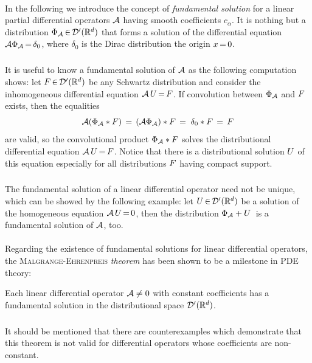\documentclass[11pt,twoside]{article}
\begin{document}
\paragraph{} %
In the following we introduce the concept of \textit{fundamental solution}
for a linear partial differential operators ${\mathcal{A}}$
having smooth coefficients $c_{\alpha}$.
It is nothing but a distribution $\Phi_{{\mathcal{A}}} {\,\in\,} {\mathcal{D}}'({\mathbb{R}}^d)$
that forms a solution of the differential equation
${\mathcal{A}} \Phi_{{\mathcal{A}}} {\,=\,} \delta_0$,
where $\delta_0$ is the Dirac distribution {\wrt} the origin $x {\,=\,} 0$.

\subparagraph{}
It is useful to know a fundamental solution of ${\mathcal{A}}$
as the following computation shows:
let $F {\,\in\,} {\mathcal{D}}'({\mathbb{R}}^d)$ be any Schwartz distribution and consider the
inhomogeneous differential equation ${\mathcal{A}} \, U {\,=\,} F$.
If convolution between $\Phi_{{\mathcal{A}}}$ and $F$ exists,
then the equalities
\[
{\mathcal{A}}(\Phi_{{\mathcal{A}}} \ast F)  \,=\,
({\mathcal{A}} \Phi_{{\mathcal{A}}}) \ast F \, = \;
\delta_0 \ast F         \,=\, F
\]
are valid,
so the convolutional product $\Phi_{{\mathcal{A}}} \ast F$
solves the distributional differential equation ${\mathcal{A}} \, U {\,=\,} F$. 
Notice that
there is a distributional solution $U$ of this equation
especially for all distributions $F$ having compact support.

\subparagraph{}
The fundamental solution of a linear differential operator
need not be unique,
which can be showed by the following example:
let $U {\,\in\,} {\mathcal{D}}'({\mathbb{R}}^d)$ be a solution of the homogeneous equation
${\mathcal{A}} \, U {\,=\,} 0$,
then the distribution $\Phi_{{\mathcal{A}}} + U\,$
is a fundamental solution of ${\mathcal{A}}$, too.

\paragraph{} %
Regarding the existence of fundamental solutions for linear 
differential operators,
the \textsc{Malgrange-Ehrenpreis} \textit{theorem}
has been shown to be a milestone in PDE theory:

\begin{theorem}\label{MALGRANGE-EHRENPREIS_THEOREM}
Each linear differential operator ${\mathcal{A}} \neq 0$
with constant coefficients
has a fundamental solution in the distributional space ${\mathcal{D}}'({\mathbb{R}}^d)$.
\end{theorem}

%

\subparagraph{}
It should be mentioned 
that there are counterexamples which demonstrate
that this theorem is not valid for differential operators
whose coefficients are non-constant.
\end{document}
